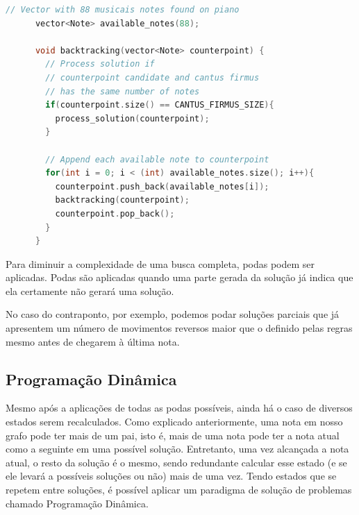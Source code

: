 
      \begin{lstlisting}[language={C++}, caption={Busca Completa}, label={codecs}]
      // Vector with 88 musicais notes found on piano
      vector<Note> available_notes(88);

      void backtracking(vector<Note> counterpoint) {
        // Process solution if
        // counterpoint candidate and cantus firmus
        // has the same number of notes
        if(counterpoint.size() == CANTUS_FIRMUS_SIZE){
          process_solution(counterpoint);
        }

        // Append each available note to counterpoint
        for(int i = 0; i < (int) available_notes.size(); i++){
          counterpoint.push_back(available_notes[i]);
          backtracking(counterpoint);
          counterpoint.pop_back();
        }
      }
      \end{lstlisting}

      Para diminuir a complexidade de uma busca completa, podas podem ser aplicadas. Podas são aplicadas quando uma parte gerada da solução já indica que ela certamente não gerará uma solução.

      No caso do contraponto, por exemplo, podemos podar soluções parciais que já apresentem um número de movimentos reversos maior que o definido pelas regras mesmo antes de chegarem à última nota.

    \subsection[Programação Dinâmica]{Programação Dinâmica}

      Mesmo após a aplicações de todas as podas possíveis, ainda há o caso de diversos estados serem recalculados. Como explicado anteriormente, uma nota em nosso grafo pode ter mais de um pai, isto é, mais de uma nota pode ter a nota atual como a seguinte em uma possível solução. Entretanto, uma vez alcançada a nota atual, o resto da solução é o mesmo, sendo redundante calcular esse estado (e se ele levará a possíveis soluções ou não) mais de uma vez. Tendo estados que se repetem entre soluções, é possível aplicar um paradigma de solução de problemas chamado Programação Dinâmica.

